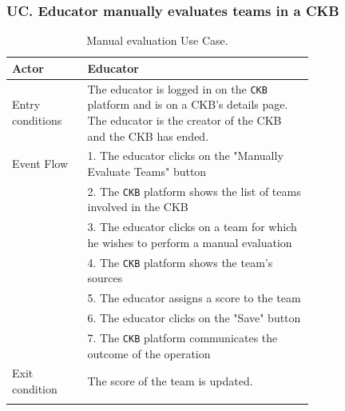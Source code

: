 \newpage
\subsubsection*{UC\cuc . Educator manually evaluates teams in a CKB}
\begin{center}
    \begin{longtable}{lp{0.75\linewidth}}
        \hline
        Actor            & Educator \\
        \hline
        Entry conditions & The educator is logged in on the \verb|CKB| platform and is on a CKB's details page. The educator is the creator of the CKB and the CKB has ended.\\
        \hline
        Event Flow      
        & 1. The educator clicks on the "Manually Evaluate Teams" button\\
        & 2. The \verb|CKB| platform shows the list of teams involved in the CKB\\
        & 3. The educator clicks on a team for which he wishes to perform a manual evaluation\\
        & 4. The \verb|CKB| platform shows the team's sources\\
        & 5. The educator assigns a score to the team\\
        & 6. The educator clicks on the "Save" button\\
        & 7. The \verb|CKB| platform communicates the outcome of the operation\\
        \hline
        Exit condition   & The score of the team is updated.   \\        
        \hline
        \caption{Manual evaluation Use Case.}
        \label{tab: manual_evaluation_use_case}
    \end{longtable}


\end{center}
